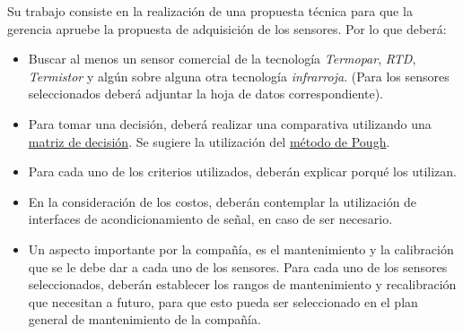 \documentclass[12pt]{article}
\begin{document}
Su trabajo consiste en la realización de una propuesta técnica para que la gerencia apruebe la propuesta de adquisición de los sensores. Por lo que deberá: 
 \begin{itemize}
     \item Buscar al menos un sensor comercial de la tecnología \textit{Termopar}, \textit{RTD},  \textit{Termistor} y algún sobre alguna otra tecnología \textit{infrarroja}. (Para los sensores seleccionados deberá adjuntar la hoja de datos correspondiente). 
     \item Para tomar una decisión, deberá realizar una comparativa utilizando una \href{https://asana.com/es/resources/decision-matrix-examples}{matriz de decisión}. Se sugiere la utilización del \href{https://www.isixsigma.com/dictionary/pugh-matrix/}{método de Pough}.
     \item Para cada uno de los criterios utilizados, deberán explicar porqué los utilizan. 
     \item En la consideración de los costos, deberán contemplar la utilización de interfaces de acondicionamiento de señal, en caso de ser necesario. 
     \item Un aspecto importante por la compañía, es el mantenimiento y la calibración que se le debe dar a cada uno de los sensores. Para cada uno de los sensores seleccionados, deberán establecer los rangos de mantenimiento y recalibración que necesitan a futuro, para que esto pueda ser seleccionado en el plan general de mantenimiento de la compañía. 
 \end{itemize}
\end{document}
